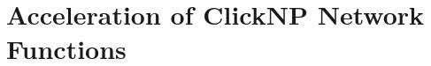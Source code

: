 \chapter{Acceleration of ClickNP Network Functions}
\label{chapter:clicknp}

\newcommand{\egg}[1] {}
\newcommand{\separate}[1] {\textbf{\center ======  #1  ====== }}
\newcommand{\smalltitle}[1] {\vspace{6pt} \noindent \textbf{#1}}

\newcommand{\tabincell}[2]{\begin{tabular}{@{}#1@{}}#2\end{tabular}}

\def\ie{\textit{i.e.}\xspace}
\def\etal{\textit{et al.}\xspace}
\def\etc{\textit{etc.}\xspace}
\def\eg{\textit{e.g.}\xspace}
\def\st{\xspace\textbf{s.t.}\xspace}
\def\whp{{\emph{w.h.p}}}
\def\cname{FICA \xspace}
\def\802{IEEE 802.11\xspace}
\def\arrow{$\rightarrow$}
\def\mrts{\textit{M-RTS}\xspace}
\def\mrtss{\textit{M-RTSes}\xspace}
\def\mcts{\textit{M-CTS}\xspace}
\def\mctss{\textit{M-CTSes}\xspace}
\def\approx{$\sim$}

\def\receivers{\textbf Q}
\def\capacity{{ \textbf{c}}}
\def\upperBound{{\mathcal D}}
\def\schedule{{\mathcal S}}
\def\throughput{{\cal T}}
\def\period{{\textbf Z}}

\def\name{ClickNP }






%
%
%


%


